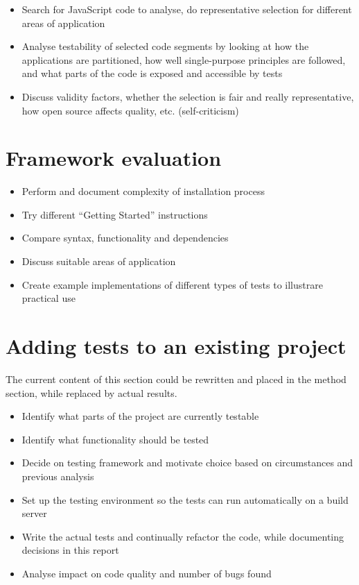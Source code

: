 \documentclass[11pt]{article}
\begin{document}
\begin{itemize}
  \item Search for JavaScript code to analyse, do representative selection for different areas of application
  \item Analyse testability of selected code segments by looking at how the applications are partitioned, how well single-purpose principles are followed, and what parts of the code is exposed and accessible by tests
  \item Discuss validity factors, whether the selection is fair and really representative, how open source affects quality, etc. (self-criticism)
\end{itemize}

\section{Framework evaluation}

\begin{itemize}
  \item Perform and document complexity of installation process
  \item Try different ``Getting Started'' instructions
  \item Compare syntax, functionality and dependencies
  \item Discuss suitable areas of application
  \item Create example implementations of different types of tests to illustrare practical use
\end{itemize}

\section{Adding tests to an existing project}

The current content of this section could be rewritten and placed in the method section, while replaced by actual results.

\begin{itemize}
  \item Identify what parts of the project are currently testable
  \item Identify what functionality should be tested
  \item Decide on testing framework and motivate choice based on circumstances and previous analysis
  \item Set up the testing environment so the tests can run automatically on a build server
  \item Write the actual tests and continually refactor the code, while documenting decisions in this report
  \item Analyse impact on code quality and number of bugs found
\end{itemize}
\end{document}
